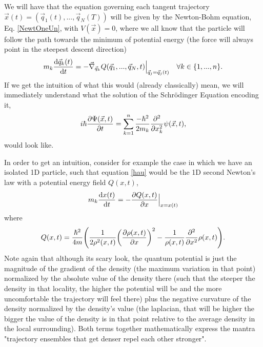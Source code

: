 \documentclass[11pt, a4paper]{article} %
\begin{document}
We will have that the equation governing each tangent trajectory $\vec{x}(t)=(\vec{q}_1(t),...,\vec{q}_N(T))$ will be given by the Newton-Bohm equation, Eq. \eqref{NewtOneUn}, with $V(\vec{x})=0$, where we all know that the particle will follow the path towards the minimum of potential energy (the force will always point in the steepest descent direction)
\begin{equation}\label{hau}
m_k\dv{\vec{q}_k(t)}{t}=-\vec{\nabla}_{\vec{q}_k}Q(\vec{q}_1,...,\vec{q}_N,t)\Big\rvert_{\vec{q}_j=\vec{q}_j(t)} \quad \forall k\in\{1,...,n\}.
\end{equation}
If we get the intuition of what this would (already classically) mean, we will immediately understand what the solution of the Schrödinger Equation encoding it,
\begin{equation}
i\hbar\pdv{\Psi(\vec{x},t)}{t}=\sum_{k=1}^n\frac{-\hbar^2}{2m_k}\pdv[2]{}{x_k}\psi(\vec{x},t),
\end{equation}
would look like.

In order to get an intuition, consider for example the case in which we have an isolated 1D particle, such that equation \eqref{hau} would be the 1D second Newton's law with a potential energy field $Q(x,t)$,
\begin{equation}\label{bestie}
m_k\dv{x(t)}{t}=-\pdv{Q(x,t)}{x}\Big\rvert_{x=x(t)}
\end{equation}
where
\begin{equation}
Q(x,t)=\frac{\hbar^2}{4m}\qty(\frac{1}{2\rho^2(x,t)}\qty(\pdv{\rho(x,t)}{x})^2-\frac{1}{\rho(x,t)}\pdv[2]{}{x}\rho(x,t)).
\end{equation}
Note again that although its scary look, the quantum potential is just the magnitude of the gradient of the density (the maximum variation in that point) normalized by the absolute value of the density there (such that the steeper the density in that locality, the higher the potential will be and the more uncomfortable the trajectory will feel there) plus the negative curvature of the density normalized by the density's value (the laplacian, that will be higher the bigger the value of the density is in that point relative to the average density in the local surrounding). Both terms together mathematically express the mantra "trajectory ensembles that get denser repel each other stronger".
\end{document}
